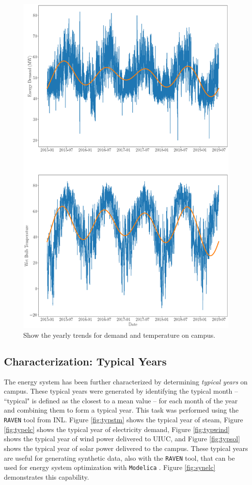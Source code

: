 \begin{figure}
  \centering
  \includegraphics[width=\textwidth]{yearlytrends}
  \caption{Show the yearly trends for demand and temperature on campus.}
  \label{fig:yearlytrends}
\end{figure}

\subsection{Characterization: Typical Years}

The energy system has been further characterized by determining \textit{typical years}
on campus. These typical years were generated by identifying the typical month --  ``typical" is defined as the closest to a mean value -- for each month of the
year and combining them to form a typical year. This task was performed using
the \texttt{RAVEN} tool from INL. Figure \ref{fig:typstm} shows the typical year
of steam, Figure \ref{fig:typelc} shows the typical year of electricity demand,
Figure \ref{fig:typwind} shows the typical year of wind power delivered to UIUC, and Figure \ref{fig:typsol} shows the typical year of solar power
delivered to the campus. These typical years are useful for generating synthetic
data, also with the \texttt{RAVEN} tool, that can be used for energy system
optimization with \texttt{Modelica} \cite{epiney_report_2017, baker_optimal_2018}. Figure \ref{fig:synelc} demonstrates this capability.

